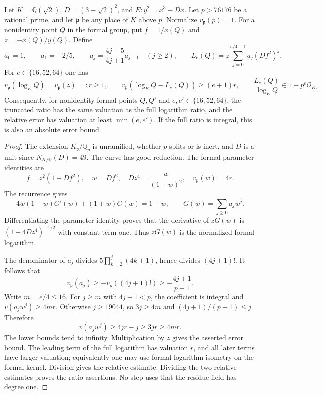 
\begin{lemma}
Let $K=\mathbb Q(\sqrt2)$, $D=(3-\sqrt2)^2$, and
$E:y^2=x^3-Dx$. Let $p>76176$ be a rational prime, and let $\mathfrak p$ be any place
of $K$ above $p$. Normalize $v_{\mathfrak p}(p)=1$.
For a nonidentity point $Q$ in the formal group, put
$f=1/x(Q)$ and $z=-x(Q)/y(Q)$. Define
\[
 a_0=1,\qquad a_1=-2/5,\qquad
 a_j=\frac{4j-5}{4j+1}a_{j-1}\quad(j\ge2),\qquad
 L_e(Q)=z\sum_{j=0}^{e/4-1}a_j(Df^2)^j.
\]
For $e\in\{16,52,64\}$ one has
\[
 v_{\mathfrak p}(\log_E Q)=v_{\mathfrak p}(z)=:r\ge1,
 \qquad
 v_{\mathfrak p}(\log_E Q-L_e(Q))\ge(e+1)r,
 \qquad
 \frac{L_e(Q)}{\log_E Q}\in1+p^e\mathcal O_{K_{\mathfrak p}}.
\]
Consequently, for nonidentity formal points $Q,Q'$ and
$e,e'\in\{16,52,64\}$, the truncated ratio has the same valuation
as the full logarithm ratio, and the relative error has valuation
at least $\min(e,e')$. If the full ratio is integral, this is also
an absolute error bound.
\end{lemma}

\begin{proof}
The extension $K_{\mathfrak p}/\mathbb Q_p$ is unramified, whether
$p$ splits or is inert, and $D$ is a unit since $N_{K/\mathbb Q}(D)=49$.
The curve has good reduction. The formal parameter identities are
\[
 f=z^2(1-Df^2),\quad w=Df^2,\quad
 Dz^4=\frac{w}{(1-w)^2},\quad v_{\mathfrak p}(w)=4r.
\]
The recurrence gives
\[
 4w(1-w)G'(w)+(1+w)G(w)=1-w,
 \qquad G(w)=\sum_{j\ge0}a_jw^j.
\]
Differentiating the parameter identity proves that the derivative
of $zG(w)$ is $(1+4Dz^4)^{-1/2}$ with constant term one. Thus
$zG(w)$ is the normalized formal logarithm.

The denominator of $a_j$ divides
$5\prod_{k=2}^j(4k+1)$, hence divides $(4j+1)!$. It follows that
\[
 v_{\mathfrak p}(a_j)\ge-v_p((4j+1)!)
 \ge-\frac{4j+1}{p-1}.
\]
Write $m=e/4\le16$. For $j\ge m$ with $4j+1<p$,
the coefficient is integral and $v(a_jw^j)\ge4mr$.
Otherwise $j\ge19044$, so $3j\ge4m$ and
$(4j+1)/(p-1)\le j$. Therefore
\[
 v(a_jw^j)\ge4jr-j\ge3jr\ge4mr.
\]
The lower bounds tend to infinity. Multiplication by $z$ gives
the asserted error bound. The leading term of the full logarithm
has valuation $r$, and all later terms have larger valuation;
equivalently one may use formal-logarithm isometry on the formal
kernel. Division gives the relative estimate. Dividing the two
relative estimates proves the ratio assertions.
No step uses that the residue field has degree one.
\end{proof}

